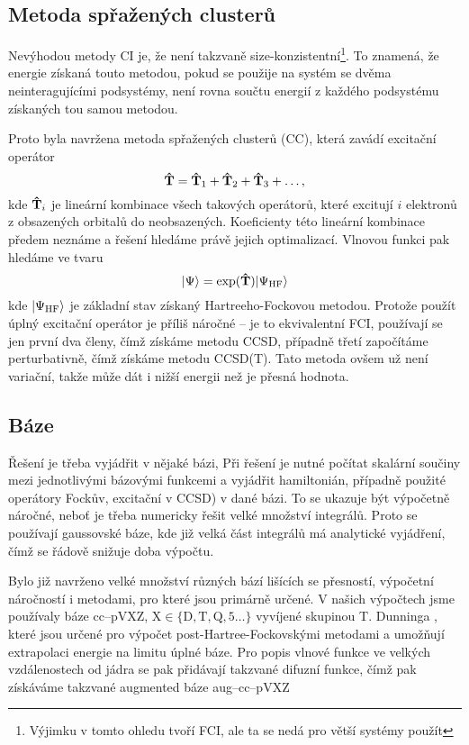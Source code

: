 \subsection{Metoda spřažených clusterů}
Nevýhodou metody CI je, že není takzvaně size-konzistentní\footnote{Výjimku v tomto 
ohledu tvoří FCI, ale ta se nedá pro větší systémy použít}. To znamená, že energie 
získaná touto metodou, pokud se použije na systém se dvěma neinteragujícími podsystémy,
není rovna součtu energií z každého podsystému získaných tou samou metodou. 

Proto byla navržena metoda spřažených clusterů (CC), která zavádí excitační operátor
\begin{equation}
\mathbf{\hat{T}} = \mathbf{\hat{T}}_1 + \mathbf{\hat{T}}_2 + \mathbf{\hat{T}}_3 + \dots,
\end{equation}
kde $\mathbf{\hat{T}}_i$ je lineární kombinace všech takových operátorů, které excitují $i$ elektronů z obsazených orbitalů do neobsazených.
Koeficienty této lineární kombinace předem neznáme a řešení hledáme právě
jejich optimalizací.
Vlnovou funkci pak hledáme ve tvaru
\begin{equation}
| \Psi \rangle = \exp(\mathbf{\hat{T}}) | \Psi_\mathrm{HF} \rangle
\end{equation}
kde $| \Psi_\mathrm{HF} \rangle$ je základní stav získaný Hartreeho-Fockovou metodou.
Protože použít úplný excitační operátor je příliš náročné -- je to 
ekvivalentní FCI, používají se jen první dva členy, čímž získáme metodu CCSD, 
případně třetí započítáme perturbativně, čímž získáme metodu CCSD(T). 
Tato metoda ovšem už není variační, takže může dát i nižší energii než je přesná hodnota. 

\subsection{Báze}
Řešení je třeba vyjádřit v nějaké bázi, 
Při řešení je nutné počítat skalární součiny mezi jednotlivými bázovými funkcemi a vyjádřit
hamiltonián, případně použité operátory Fockův, excitační v CCSD) v dané bázi. To se ukazuje být výpočetně náročné, neboť je třeba 
numericky řešit velké množství integrálů. Proto se používají gaussovské báze, kde 
již velká část integrálů má analytické 
vyjádření, čímž se řádově snižuje doba výpočtu.

Bylo již navrženo velké množství různých bází lišících se přesností, výpočetní 
náročností i metodami, pro které jsou primárně určené.
V našich výpočtech jsme používaly báze cc--pVXZ,  $\mathrm{ X \in \{D,T,Q,5\dots\}}$ vyvíjené 
skupinou T. Dunninga \cite{Dunning-basis}, 
které jsou určené pro výpočet post-Hartree-Fockovskými metodami a umožňují extrapolaci 
energie na limitu úplné báze.
Pro popis vlnové funkce ve velkých vzdálenostech od jádra se pak přidávají takzvané 
difuzní funkce, čímž pak získáváme takzvané augmented báze aug--cc--pVXZ

